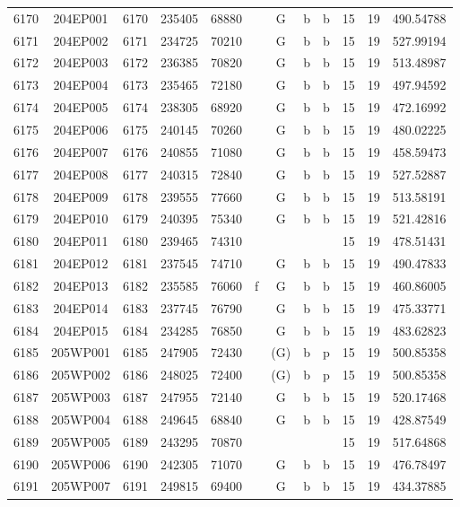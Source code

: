 \begin{tabular}{|*{12}{c|}}
6170 & 204EP001 & 6170 & 235405 & 68880 &  & G & b & b & 15 & 19 & 490.54788 \\ 
6171 & 204EP002 & 6171 & 234725 & 70210 &  & G & b & b & 15 & 19 & 527.99194 \\ 
6172 & 204EP003 & 6172 & 236385 & 70820 &  & G & b & b & 15 & 19 & 513.48987 \\ 
6173 & 204EP004 & 6173 & 235465 & 72180 &  & G & b & b & 15 & 19 & 497.94592 \\ 
6174 & 204EP005 & 6174 & 238305 & 68920 &  & G & b & b & 15 & 19 & 472.16992 \\ 
6175 & 204EP006 & 6175 & 240145 & 70260 &  & G & b & b & 15 & 19 & 480.02225 \\ 
6176 & 204EP007 & 6176 & 240855 & 71080 &  & G & b & b & 15 & 19 & 458.59473 \\ 
6177 & 204EP008 & 6177 & 240315 & 72840 &  & G & b & b & 15 & 19 & 527.52887 \\ 
6178 & 204EP009 & 6178 & 239555 & 77660 &  & G & b & b & 15 & 19 & 513.58191 \\ 
6179 & 204EP010 & 6179 & 240395 & 75340 &  & G & b & b & 15 & 19 & 521.42816 \\ 
6180 & 204EP011 & 6180 & 239465 & 74310 &  &  &  &  & 15 & 19 & 478.51431 \\ 
6181 & 204EP012 & 6181 & 237545 & 74710 &  & G & b & b & 15 & 19 & 490.47833 \\ 
6182 & 204EP013 & 6182 & 235585 & 76060 & f & G & b & b & 15 & 19 & 460.86005 \\ 
6183 & 204EP014 & 6183 & 237745 & 76790 &  & G & b & b & 15 & 19 & 475.33771 \\ 
6184 & 204EP015 & 6184 & 234285 & 76850 &  & G & b & b & 15 & 19 & 483.62823 \\ 
6185 & 205WP001 & 6185 & 247905 & 72430 &  & (G) & b & p & 15 & 19 & 500.85358 \\ 
6186 & 205WP002 & 6186 & 248025 & 72400 &  & (G) & b & p & 15 & 19 & 500.85358 \\ 
6187 & 205WP003 & 6187 & 247955 & 72140 &  & G & b & b & 15 & 19 & 520.17468 \\ 
6188 & 205WP004 & 6188 & 249645 & 68840 &  & G & b & b & 15 & 19 & 428.87549 \\ 
6189 & 205WP005 & 6189 & 243295 & 70870 &  &  &  &  & 15 & 19 & 517.64868 \\ 
6190 & 205WP006 & 6190 & 242305 & 71070 &  & G & b & b & 15 & 19 & 476.78497 \\ 
6191 & 205WP007 & 6191 & 249815 & 69400 &  & G & b & b & 15 & 19 & 434.37885 \\ 

\end{tabular}
